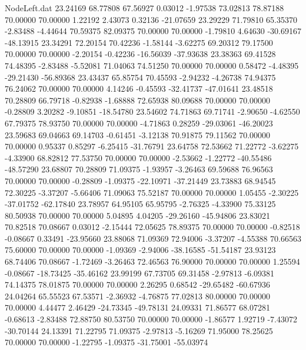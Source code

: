\begin{filecontents}{NodeLeft.dat}
  23.24169   68.77808   67.56927     0.03012   -1.97538   73.02813   78.87188   70.00000   70.00000    1.22192    2.43073    0.32136  -21.07659
  23.29229   71.79810   65.35370    -2.83488   -4.44644   70.59375   82.09375   70.00000   70.00000   -1.79810    4.64630  -30.69167  -48.13915
  23.34291   72.20154   70.42236    -1.58144   -3.62275   69.20312   79.17500   70.00000   70.00000   -2.20154   -0.42236  -16.56039  -37.93638
  23.38363   69.41528   74.48395    -2.83488   -5.52081   71.04063   74.51250   70.00000   70.00000    0.58472   -4.48395  -29.21430  -56.89368
  23.43437   65.85754   70.45593    -2.94232   -4.26738   74.94375   76.24062   70.00000   70.00000    4.14246   -0.45593  -32.41737  -47.01641
  23.48518   70.28809   66.79718    -0.82938   -1.68888   72.65938   80.09688   70.00000   70.00000   -0.28809    3.20282   -9.10851  -18.54780
  23.54602   74.71863   69.71741    -2.90650   -4.62550   67.79375   78.93750   70.00000   70.00000   -4.71863    0.28259  -29.03061  -46.20023
  23.59683   69.04663   69.14703    -0.61451   -3.12138   70.91875   79.11562   70.00000   70.00000    0.95337    0.85297   -6.25415  -31.76791
  23.64758   72.53662   71.22772    -3.62275   -4.33900   68.82812   77.53750   70.00000   70.00000   -2.53662   -1.22772  -40.55486  -48.57290
  23.68807   70.28809   71.09375    -1.93957   -3.26463   69.59688   76.96563   70.00000   70.00000   -0.28809   -1.09375  -22.10971  -37.21449
  23.73883   68.94545   72.30225    -3.37207   -5.66406   71.09063   75.52187   70.00000   70.00000    1.05455   -2.30225  -37.01752  -62.17840
  23.78957   64.95105   65.95795    -2.76325   -4.33900   75.33125   80.50938   70.00000   70.00000    5.04895    4.04205  -29.26160  -45.94806
  23.83021   70.82518   70.08667     0.03012   -2.15444   72.05625   78.89375   70.00000   70.00000   -0.82518   -0.08667    0.33491  -23.95660
  23.88068   71.09369   72.94006    -3.37207   -4.55388   70.66563   75.60000   70.00000   70.00000   -1.09369   -2.94006  -38.16585  -51.54187
  23.93123   68.74406   70.08667    -1.72469   -3.26463   72.46563   76.90000   70.00000   70.00000    1.25594   -0.08667  -18.73425  -35.46162
  23.99199   67.73705   69.31458    -2.97813   -6.09381   74.14375   78.01875   70.00000   70.00000    2.26295    0.68542  -29.65482  -60.67936
  24.04264   65.55523   67.53571    -2.36932   -4.76875   77.02813   80.00000   70.00000   70.00000    4.44477    2.46429  -24.73345  -49.78131
  24.09331   71.86577   68.07281    -0.68613   -2.83488   72.88750   80.53750   70.00000   70.00000   -1.86577    1.92719   -7.43072  -30.70144
  24.13391   71.22795   71.09375    -2.97813   -5.16269   71.95000   78.25625   70.00000   70.00000   -1.22795   -1.09375  -31.75001  -55.03974

\end{filecontents}
